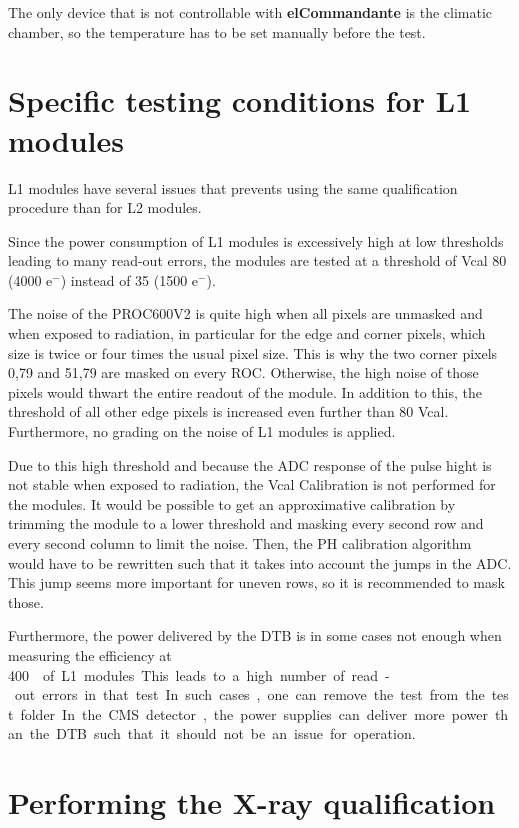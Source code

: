 \documentclass[a4paper,12pt,twoside]{article}
\begin{document}
The only device that is not controllable with \textbf{elCommandante} is the climatic chamber, so the temperature has to be set manually before the test.


\section{Specific testing conditions for L1 modules}

L1 modules have several issues that prevents using the same qualification procedure than for L2 modules. 

Since the power consumption of L1 modules is excessively high at low thresholds leading to many read-out errors, the modules are tested at a threshold of Vcal 80 (4000 e$^-$) instead of 35 (1500 e$^-$). 

The noise of the PROC600V2 is quite high when all pixels are unmasked and when exposed to radiation, in particular for the edge and corner pixels, which size is twice or four times the usual pixel size. This is why the two corner pixels 0,79 and 51,79 are masked on every ROC. Otherwise, the high noise of those pixels would thwart the entire readout of the module. In addition to this, the threshold of all other edge pixels is increased even further than 80 Vcal. Furthermore, no grading on the noise of L1 modules is applied.

Due to this high threshold and because the ADC response of the pulse hight is not stable when exposed to radiation, the Vcal Calibration is not performed for the modules. 
It would be possible to get an approximative calibration by trimming the module to a lower threshold and masking every second row and every second column to limit the noise. Then, the PH calibration algorithm would have to be rewritten such that it takes into account the jumps in the ADC. This jump seems more important for uneven rows, so it is recommended to mask those.

Furthermore, the power delivered by the DTB is in some cases not enough when measuring the efficiency at \SI{400}{\mega\hertz\per\centi\meter\square} of L1 modules. This leads to a high number of read-out errors in that test. In such cases, one can remove the test from the test folder. In the CMS detector, the power supplies can deliver more power than the DTB such that it should not be an issue for operation. 


\section{Performing the X-ray qualification}
\end{document}
